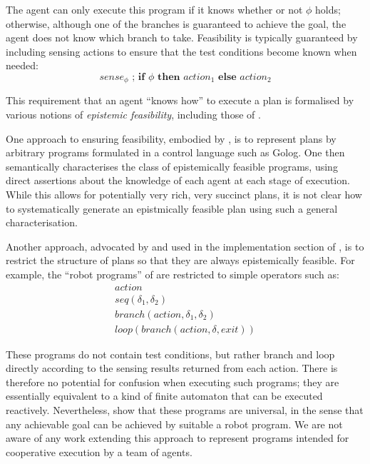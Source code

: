 The agent can only execute this program if it knows whether or not
$\phi$ holds; otherwise, although one of the branches is guaranteed
to achieve the goal, the agent does not know which branch to take.
Feasibility is typically guaranteed by including sensing actions to
ensure that the test conditions become known when needed:\[
sense_{\phi}\,\,;\,\mathbf{if\,}\,\phi\,\,\mathbf{then}\,\, action_{1}\,\,\mathbf{else\,}\, action_{2}\]


This requirement that an agent {}``knows how'' to execute a plan
is formalised by various notions of \emph{epistemic feasibility},
including those of \citep{levesque98what_robots_can_do,levesque00knowing_how,Lesperance01epi_feas_casl,giacomo04sem_delib_indigolog,baier06programs_that_sense}.

One approach to ensuring feasibility, embodied by \citep{levesque00knowing_how,giacomo04sem_delib_indigolog,baier06programs_that_sense},
is to represent plans by arbitrary programs formulated in a control
language such as Golog. One then semantically characterises the class
of epistemically feasible programs, using direct assertions about
the knowledge of each agent at each stage of execution. While this
allows for potentially very rich, very succinct plans, it is not clear
how to systematically generate an epistmically feasible plan using
such a general characterisation.

Another approach, advocated by \citep{levesque96what_is_planning,levesque98what_robots_can_do}
and used in the implementation section of \citep{giacomo04sem_delib_indigolog},
is to restrict the structure of plans so that they are always epistemically
feasible. For example, the {}``robot programs'' of \citep{levesque98what_robots_can_do}
are restricted to simple operators such as:\begin{gather*}
action\\
seq(\delta_{1},\delta_{2})\\
branch(action,\delta_{1},\delta_{2})\\
loop(branch(action,\delta,exit))\end{gather*}


These programs do not contain test conditions, but rather branch and
loop directly according to the sensing results returned from each
action. There is therefore no potential for confusion when executing
such programs; they are essentially equivalent to a kind of finite
automaton that can be executed reactively. Nevertheless, \citet{levesque98what_robots_can_do}
show that these programs are universal, in the sense that any achievable
goal can be achieved by suitable a robot program. We are not aware
of any work extending this approach to represent programs intended
for cooperative execution by a team of agents.

